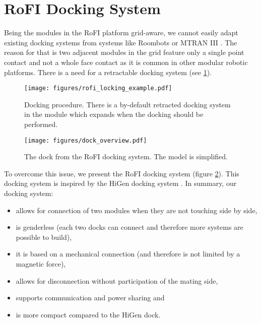 \section{RoFI Docking System}\label{sec:dock}

Being the modules in the RoFI platform grid-aware, we cannot easily adapt
existing docking systems from systems like
Roombots\cite{bonardi_locomotion_2012} or MTRAN III
\cite{kurokawa_distributed_2008}. The reason for that is two adjacent modules in
the grid feature only a single point contact and not a whole face contact as it
is common in other modular robotic platforms. There is a need for a retractable
docking system (see \ref{fig:rofi_locking_example}).

\begin{figure}[h!]
    \centering
    \texttt{[image: figures/rofi\_locking\_example.pdf]}
    \caption{Docking procedure. There is a by-default retracted docking system
    in the module which expands when the docking should be performed.}
    \label{fig:rofi_locking_example}
\end{figure}


\begin{figure}[h!]
    \centering
    \texttt{[image: figures/dock\_overview.pdf]}
    \caption{The dock from the RoFI docking system. The model is simplified.}
    \label{fig:dock_overview}
\end{figure}

To overcome this issue, we present the RoFI docking system (figure
\ref{fig:dock_overview}). This docking system is inspired by the HiGen docking
system \cite{parrott_higen:_2014}. In summary, our docking system:
\begin{itemize}
    \item allows for connection of two modules when they are not touching side
    by side,
    \item is genderless (each two docks can connect and therefore more systems
    are possible to build),
    \item it is based on a mechanical connection (and therefore is not limited
    by a magnetic force),
    \item allows for disconnection without participation of the mating side,
    \item supports communication and power sharing and
    \item is more compact compared to the HiGen dock.
\end{itemize}

